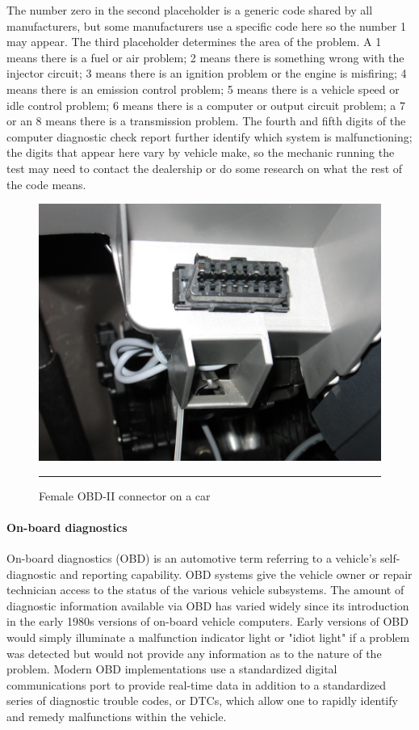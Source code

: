 The number zero in the second placeholder is a generic code shared by all manufacturers, but some manufacturers use a specific code here so the number 1 may appear. The third placeholder determines the area of the problem. A 1 means there is a fuel or air problem; 2 means there is something wrong with the injector circuit; 3 means there is an ignition problem or the engine is misfiring; 4 means there is an emission control problem; 5 means there is a vehicle speed or idle control problem; 6 means there is a computer or output circuit problem; a 7 or an 8 means there is a transmission problem. The fourth and fifth digits of the computer diagnostic check report further identify which system is malfunctioning; the digits that appear here vary by vehicle make, so the mechanic running the test may need to contact the dealership or do some research on what the rest of the code means.
\begin{figure}[h!]
  \centering
    \includegraphics[width=1\textwidth]{./Pictures/OBD_002.jpg}
  \rule{1\textwidth}{1pt}
 \caption{Female OBD-II connector on a car}
\end{figure}

\paragraph*{On-board diagnostics}
\hfill \break
On-board diagnostics (OBD) is an automotive term referring to a vehicle's self-diagnostic and reporting capability. OBD systems give the vehicle owner or repair technician access to the status of the various vehicle subsystems. The amount of diagnostic information available via OBD has varied widely since its introduction in the early 1980s versions of on-board vehicle computers. Early versions of OBD would simply illuminate a malfunction indicator light or "idiot light" if a problem was detected but would not provide any information as to the nature of the problem. Modern OBD implementations use a standardized digital communications port to provide real-time data in addition to a standardized series of diagnostic trouble codes, or DTCs, which allow one to rapidly identify and remedy malfunctions within the vehicle.

